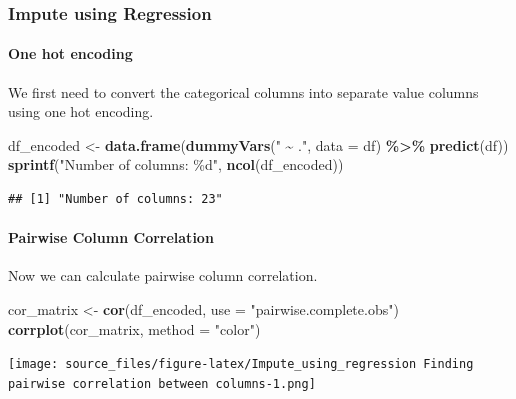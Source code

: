 \documentclass[
]{article}
\newenvironment{Shaded}{\begin{snugshade}}{\end{snugshade}}
\newcommand{\AttributeTok}[1]{\textcolor[rgb]{0.13,0.29,0.53}{#1}}
\newcommand{\FunctionTok}[1]{\textcolor[rgb]{0.13,0.29,0.53}{\textbf{#1}}}
\newcommand{\NormalTok}[1]{#1}
\newcommand{\OtherTok}[1]{\textcolor[rgb]{0.56,0.35,0.01}{#1}}
\newcommand{\SpecialCharTok}[1]{\textcolor[rgb]{0.81,0.36,0.00}{\textbf{#1}}}
\newcommand{\StringTok}[1]{\textcolor[rgb]{0.31,0.60,0.02}{#1}}
\begin{document}
\hypertarget{impute-using-regression}{%
\subsubsection{Impute using Regression}\label{impute-using-regression}}

\hypertarget{one-hot-encoding}{%
\paragraph{One hot encoding}\label{one-hot-encoding}}

We first need to convert the categorical columns into separate value
columns using one hot encoding.

\begin{Shaded}
\begin{Highlighting}[]
\NormalTok{df\_encoded }\OtherTok{\textless{}{-}} \FunctionTok{data.frame}\NormalTok{(}\FunctionTok{dummyVars}\NormalTok{(}\StringTok{" \textasciitilde{} ."}\NormalTok{, }\AttributeTok{data =}\NormalTok{ df) }\SpecialCharTok{\%\textgreater{}\%} \FunctionTok{predict}\NormalTok{(df))}
\FunctionTok{sprintf}\NormalTok{(}\StringTok{"Number of columns: \%d"}\NormalTok{, }\FunctionTok{ncol}\NormalTok{(df\_encoded))}
\end{Highlighting}
\end{Shaded}

\begin{verbatim}
## [1] "Number of columns: 23"
\end{verbatim}

\hypertarget{pairwise-column-correlation}{%
\paragraph{Pairwise Column
Correlation}\label{pairwise-column-correlation}}

Now we can calculate pairwise column correlation.

\begin{Shaded}
\begin{Highlighting}[]
\NormalTok{cor\_matrix }\OtherTok{\textless{}{-}} \FunctionTok{cor}\NormalTok{(df\_encoded, }\AttributeTok{use =} \StringTok{"pairwise.complete.obs"}\NormalTok{)}
\FunctionTok{corrplot}\NormalTok{(cor\_matrix, }\AttributeTok{method =} \StringTok{"color"}\NormalTok{)}
\end{Highlighting}
\end{Shaded}

\texttt{[image: source\_files/figure-latex/Impute\_using\_regression Finding pairwise correlation between columns-1.png]}
\end{document}
